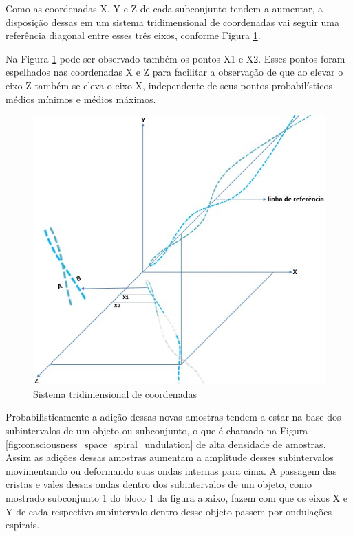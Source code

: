 Como as coordenadas X, Y e Z de cada subconjunto tendem a aumentar, a disposição dessas em um sistema tridimensional de coordenadas vai seguir uma referência diagonal entre esses três eixos, conforme Figura \ref{fig:consciousness_space_spiral_reference_line}.

Na Figura \ref{fig:consciousness_space_spiral_reference_line} pode ser observado também os pontos X1 e X2. Esses pontos foram espelhados nas coordenadas X e Z para facilitar a observação de que ao elevar o eixo Z também se eleva o eixo X, independente de seus pontos probabilísticos médios mínimos e médios máximos.
	\begin{figure}[H]
	\caption{Sistema tridimensional de coordenadas}
	\label{fig:consciousness_space_spiral_reference_line}
	\centering
	\includegraphics[scale=.5]{sections/images/consciousness_space_spiral_reference_line.jpg}
	\end{figure}

Probabilisticamente a adição dessas novas amostras tendem a estar na base dos subintervalos de um objeto ou subconjunto, o que é chamado na Figura \ref{fig:consciousness_space_spiral_undulation} de alta densidade de amostras. Assim as adições dessas amostras aumentam a amplitude desses subintervalos movimentando ou deformando suas ondas internas para cima. A passagem das cristas e vales dessas ondas dentro dos subintervalos de um objeto, como mostrado subconjunto 1 do bloco 1 da figura abaixo, fazem com que os eixos X e Y de cada respectivo subintervalo dentro desse objeto passem por ondulações espirais.

